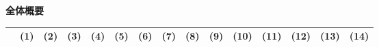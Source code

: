 \textbf{全体概要}\par\vspace*{0.3\baselineskip}

\begin{table}[h]
    \begin{tabular}{lcccccccccccccc}
        \toprule
         & (1) & (2) & (3) & (4) & (5) & (6) & (7) & (8) & (9) & (10) & (11) & (12) & (13) & (14)\\
        \midrule
        \midrule
        \midrule
        \toprule
    \end{tabular}
\end{table}
